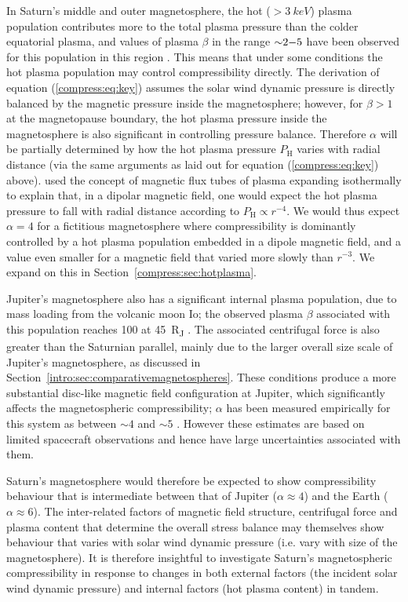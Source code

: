 In Saturn's middle and outer magnetosphere, the  hot  ($>\SI{3}{keV}$) plasma population contributes more to the total plasma pressure than the colder equatorial plasma,  and values of plasma $\beta$ in the range ${\sim}2{\--}5$ have been observed  for this population in this region \citep{sergis2010}. This means that under some conditions the hot plasma population may control compressibility directly. The derivation of equation (\ref{compress:eq:key}) assumes the solar wind dynamic pressure is directly balanced by the magnetic pressure inside the magnetosphere; however, for $\beta > 1$ at the magnetopause boundary, the hot plasma pressure inside the magnetosphere is also significant in controlling pressure balance. Therefore $\alpha$ will be partially determined by how the hot plasma pressure $P_\mathrm{H}$ varies with radial distance (via the same arguments as laid out for equation (\ref{compress:eq:key}) above). \citet{gold1959} used the concept of magnetic flux tubes of plasma expanding isothermally to explain that, in a dipolar magnetic field, one would expect the hot plasma pressure to fall with radial distance according to $P_\mathrm{H} \propto r^{-4}$. We would thus expect $\alpha = 4$ for a fictitious magnetosphere where compressibility is dominantly controlled by a hot plasma population embedded in a dipole magnetic field, and a value even smaller for a magnetic field that varied more slowly than $r^{-3}$. We expand on this in Section~\ref{compress:sec:hotplasma}.

Jupiter's magnetosphere also has a significant internal plasma population, due to mass loading from the volcanic moon Io; the observed plasma $\beta$ associated with this population reaches 100 at \SI{45}{R_J} \citep{mauk2004}. The associated centrifugal force is also greater than the Saturnian parallel, mainly due to the larger overall size scale of Jupiter's magnetosphere, as discussed in Section~\ref{intro:sec:comparativemagnetospheres}. These conditions produce a more substantial disc-like magnetic field configuration at Jupiter, which significantly affects the magnetospheric compressibility; $\alpha$ has been measured empirically for this system as between ${\sim}4$ and ${\sim}5$ \citep{huddleston1998, joy2002, alexeev2005}. However these estimates are based on limited spacecraft observations and hence have large uncertainties associated with them.

Saturn's magnetosphere would therefore be expected to show compressibility behaviour that is intermediate between that of Jupiter ($\alpha \approx 4$) and the Earth ($\alpha \approx 6$). The inter-related factors of magnetic field structure, centrifugal force and plasma content that determine the overall stress balance may themselves show behaviour that varies with solar wind dynamic pressure (i.e. vary with size of the magnetosphere). It is therefore insightful to investigate Saturn's magnetospheric compressibility in response to changes in both external factors (the incident solar wind dynamic pressure) and internal factors (hot plasma content) in tandem.

